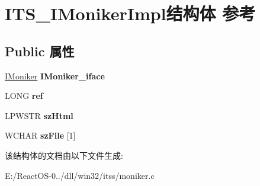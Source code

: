 \hypertarget{struct_i_t_s___i_moniker_impl}{}\section{I\+T\+S\+\_\+\+I\+Moniker\+Impl结构体 参考}
\label{struct_i_t_s___i_moniker_impl}
\subsection*{Public 属性}
\begin{DoxyCompactItemize}
\item 
\mbox{\label{struct_i_t_s___i_moniker_impl_abf89991a67d4fd54a0f8f928033093ab}} 
\hyperlink{interface_i_moniker}{I\+Moniker} {\bfseries I\+Moniker\+\_\+iface}
\item 
\mbox{\label{struct_i_t_s___i_moniker_impl_aea318a86407abd0d3349b12b8cb814e0}} 
L\+O\+NG {\bfseries ref}
\item 
\mbox{\label{struct_i_t_s___i_moniker_impl_ae830ee76c2c9e68553490a0e58797f5b}} 
L\+P\+W\+S\+TR {\bfseries sz\+Html}
\item 
\mbox{\label{struct_i_t_s___i_moniker_impl_adece4a10265a86643f774b0fea7b029e}} 
W\+C\+H\+AR {\bfseries sz\+File} \mbox{[}1\mbox{]}
\end{DoxyCompactItemize}


该结构体的文档由以下文件生成\+:\begin{DoxyCompactItemize}
\item 
E\+:/\+React\+O\+S-\/0../dll/win32/itss/moniker.\+c\end{DoxyCompactItemize}
